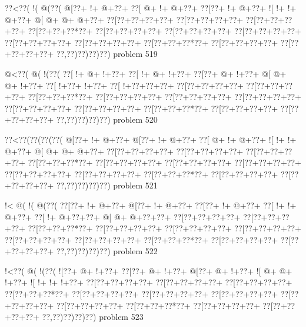 \vbox{\vbox{\goo
\0??<\0??(\- !(\- @(\0??(
\- @[\0??+\- !+\- @+\0??+
\0??[\- @+\- !+\- @+\0??+
\0??[\0??+\- !+\- @+\0??+
\- ![\- !+\- !+\- @+\0??+
\- @[\- @+\- @+\- @+\0??+
\0??[\0??+\0??+\0??+\0??+
\0??[\0??+\0??+\0??+\0??+
\0??[\0??+\0??+\0??+\0??+
\0??[\0??+\0??+\0??*\0??+
\0??[\0??+\0??+\0??+\0??+
\0??[\0??+\0??+\0??+\0??+
\0??[\0??+\0??+\0??+\0??+
\0??[\0??+\0??+\0??+\0??+
\0??[\0??+\0??+\0??+\0??+
\0??[\0??+\0??+\0??*\0??+
\0??[\0??+\0??+\0??+\0??+
\0??[\0??+\0??+\0??+\0??+
\0??,\0??)\0??)\0??)\0??)
}
\hfil problem 519\hfil\break
}

\vbox{\vbox{\goo
\- @<\0??(\- @(\- !(\0??(
\0??[\- !+\- @+\- !+\0??+
\0??[\- !+\- @+\- !+\0??+
\0??[\0??+\- @+\- !+\0??+
\- @[\- @+\- @+\- !+\0??+
\0??[\- !+\0??+\- !+\0??+
\0??[\- !+\0??+\0??+\0??+
\0??[\0??+\0??+\0??+\0??+
\0??[\0??+\0??+\0??+\0??+
\0??[\0??+\0??+\0??*\0??+
\0??[\0??+\0??+\0??+\0??+
\0??[\0??+\0??+\0??+\0??+
\0??[\0??+\0??+\0??+\0??+
\0??[\0??+\0??+\0??+\0??+
\0??[\0??+\0??+\0??+\0??+
\0??[\0??+\0??+\0??*\0??+
\0??[\0??+\0??+\0??+\0??+
\0??[\0??+\0??+\0??+\0??+
\0??,\0??)\0??)\0??)\0??)
}
\hfil problem 520\hfil\break
}

\vbox{\vbox{\goo
\0??<\0??(\0??(\0??(\0??(
\- @[\0??+\- !+\- @+\0??+
\- @[\0??+\- !+\- @+\0??+
\0??[\- @+\- !+\- @+\0??+
\- ![\- !+\- !+\- @+\0??+
\- @[\- @+\- @+\- @+\0??+
\0??[\0??+\0??+\0??+\0??+
\0??[\0??+\0??+\0??+\0??+
\0??[\0??+\0??+\0??+\0??+
\0??[\0??+\0??+\0??*\0??+
\0??[\0??+\0??+\0??+\0??+
\0??[\0??+\0??+\0??+\0??+
\0??[\0??+\0??+\0??+\0??+
\0??[\0??+\0??+\0??+\0??+
\0??[\0??+\0??+\0??+\0??+
\0??[\0??+\0??+\0??*\0??+
\0??[\0??+\0??+\0??+\0??+
\0??[\0??+\0??+\0??+\0??+
\0??,\0??)\0??)\0??)\0??)
}
\hfil problem 521\hfil\break
}

\vbox{\vbox{\goo
\- !<\- @(\- !(\- @(\0??(
\0??[\0??+\- !+\- @+\0??+
\- @[\0??+\- !+\- @+\0??+
\0??[\0??+\- !+\- @+\0??+
\0??[\- !+\- !+\- @+\0??+
\0??[\- !+\- @+\0??+\0??+
\- @[\- @+\- @+\0??+\0??+
\0??[\0??+\0??+\0??+\0??+
\0??[\0??+\0??+\0??+\0??+
\0??[\0??+\0??+\0??*\0??+
\0??[\0??+\0??+\0??+\0??+
\0??[\0??+\0??+\0??+\0??+
\0??[\0??+\0??+\0??+\0??+
\0??[\0??+\0??+\0??+\0??+
\0??[\0??+\0??+\0??+\0??+
\0??[\0??+\0??+\0??*\0??+
\0??[\0??+\0??+\0??+\0??+
\0??[\0??+\0??+\0??+\0??+
\0??,\0??)\0??)\0??)\0??)
}
\hfil problem 522\hfil\break
}

\vbox{\vbox{\goo
\- !<\0??(\- @(\- !(\0??(
\- ![\0??+\- @+\- !+\0??+
\0??[\0??+\- @+\- !+\0??+
\- @[\0??+\- @+\- !+\0??+
\- ![\- @+\- @+\- !+\0??+
\- ![\- !+\- !+\- !+\0??+
\0??[\0??+\0??+\0??+\0??+
\0??[\0??+\0??+\0??+\0??+
\0??[\0??+\0??+\0??+\0??+
\0??[\0??+\0??+\0??*\0??+
\0??[\0??+\0??+\0??+\0??+
\0??[\0??+\0??+\0??+\0??+
\0??[\0??+\0??+\0??+\0??+
\0??[\0??+\0??+\0??+\0??+
\0??[\0??+\0??+\0??+\0??+
\0??[\0??+\0??+\0??*\0??+
\0??[\0??+\0??+\0??+\0??+
\0??[\0??+\0??+\0??+\0??+
\0??,\0??)\0??)\0??)\0??)
}
\hfil problem 523\hfil\break
}

